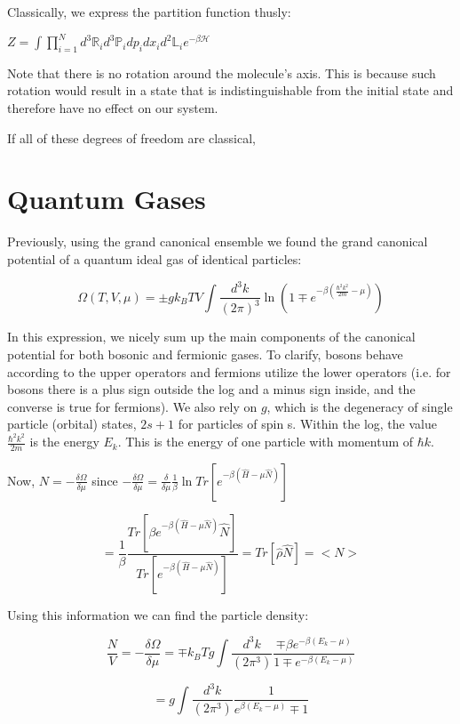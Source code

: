 \documentclass{article}
\newcommand{\pardif}[2]{\frac{\delta#1}{\delta#2}}
\newcommand{\bltz}{k_{B}}
\begin{document}
Classically, we express the partition function thusly:

$Z=\int\prod_{i=1}^{N}d^{3}\mathbb{R}_{i}d^{3}\mathbb{P}_{i}dp_{i}dx_{i}d^{2}\mathbb{L}_{i}e^{-\beta\mathcal{H}}$

Note that there is no rotation around the molecule's axis.  This is because such rotation would result in a state that is indistinguishable from the initial state and therefore have no effect on our system.

If all of these degrees of freedom are classical,


\part{Quantum Gases}

Previously, using the grand canonical ensemble we found the grand canonical potential of a quantum ideal gas of identical particles:

$$\Omega(T,V,\mu)=\pm g\bltz TV\int\frac{d^{3}k}{(2\pi)^{3}}\ln(1\mp e^{-\beta(\frac{\hbar^{2}k^{2}}{2m}-\mu)})$$

In this expression, we nicely sum up the main components of the canonical potential for both bosonic and fermionic gases.  To clarify, bosons behave according to the upper operators and fermions utilize the lower operators (i.e. for bosons there is a plus sign outside the log and a minus sign inside, and the converse is true for fermions).  We also rely on $g$, which is the degeneracy of single particle (orbital) states, $2s+1$ for particles of spin s.  Within the log, the value $\frac{\hbar^{2}k^{2}}{2m}$ is the energy $E_{k}$.  This is the energy of one particle with momentum of $\hbar k$.  

Now, $N=-\pardif{\Omega}{\mu}$ since $-\pardif{\Omega}{\mu}=\frac{\delta}{\delta \mu}\frac{1}{\beta}\ln{Tr[e^{-\beta(\hat{H}-\mu\hat{N})}]}$

$$=\frac{1}{\beta}\frac{Tr[\beta e^{-\beta(\hat{H}-\mu\hat{N})}\hat{N}]}{Tr[e^{-\beta(\hat{H}-\mu\hat{N})}]}=Tr[\hat{\rho}\hat{N}]=<N>$$
 
Using this information we can find the particle density:

$$\frac{N}{V}=-\pardif{\Omega}{\mu}=\mp\bltz Tg\int \frac{d^{3}k}{(2\pi^{3})}\frac{\mp\beta e^{-\beta(E_{k}-\mu)}}{1\mp e^{-\beta(E_{k}-\mu)}}$$

$$=g\int\frac{d^{3}k}{(2\pi^{3})}\frac{1}{e^{\beta(E_{k}-\mu)}\mp1}$$
\end{document}
